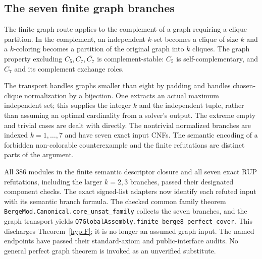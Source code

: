 \documentclass[11pt]{article}
\theoremstyle{definition}\newtheorem{definition}[theorem]{Definition}
\theoremstyle{remark}\newtheorem{remark}[theorem]{Remark}
\newcommand{\src}[1]{{\small\nolinkurl{#1}}}
\begin{document}
\subsection{The seven finite graph branches}
The finite graph route applies to the complement of a graph requiring a clique partition. In the complement, an independent $k$-set becomes a clique of size $k$ and a $k$-coloring becomes a partition of the original graph into $k$ cliques. The graph property excluding $C_5,C_7,\overline{C_7}$ is complement-stable: $C_5$ is self-complementary, and $C_7$ and its complement exchange roles.

The transport handles graphs smaller than eight by padding and handles chosen-clique normalization by a bijection. One extracts an actual maximum independent set; this supplies the integer $k$ and the independent tuple, rather than assuming an optimal cardinality from a solver's output. The extreme empty and trivial cases are dealt with directly. The nontrivial normalized branches are indexed $k=1,\ldots,7$ and have seven exact input CNFs. The semantic encoding of a forbidden non-colorable counterexample and the finite refutations are distinct parts of the argument.

All 386 modules in the finite semantic descriptor closure and all seven exact RUP refutations, including the larger $k=2,3$ branches, passed their designated component checks. The exact signed-list adapters now identify each refuted input with its semantic branch formula. The checked common family theorem \src{BergeMod.Canonical.core_unsat_family} collects the seven branches, and the graph transport yields \src{Q7GlobalAssembly.finite_berge8_perfect_cover}. This discharges Theorem~\ref{hyp:F}; it is no longer an assumed graph input. The named endpoints have passed their standard-axiom and public-interface audits. No general perfect graph theorem is invoked as an unverified substitute.
\end{document}
